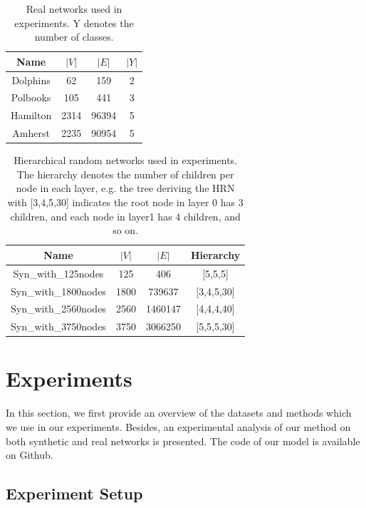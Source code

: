 \documentclass{article}
\theoremstyle{definition}
\begin{document}
 \begin{table}
		\centering
		\begin{tabular}{|c|c|c|c|}
			\hline
			Name & $|V|$ & $|E|$ & $|Y|$\\
			\hline
			Dolphins & 62 & 159 & 2\\
			Polbooks & 105 & 441 & 3\\
			Hamilton & 2314 & 96394 & 5\\
			Amherst & 2235 & 90954 & 5\\
			\hline
		\end{tabular}
		\caption{Real networks used in experiments. Y denotes the number of classes.}
		\label{tab:real_datasets}
	\end{table}
		
	\begin{table}
		\centering
		\begin{tabular}{|c|c|c|c|}
			\hline
			Name & $|V|$ & $|E|$ & Hierarchy \\
			\hline
			Syn\_with\_125nodes & 125 & 406 & [5,5,5]\\
			Syn\_with\_1800nodes & 1800 & 739637 & [3,4,5,30]\\
			Syn\_with\_2560nodes & 2560 & 1460147 & [4,4,4,40]\\
			Syn\_with\_3750nodes & 3750 & 3066250 & [5,5,5,30]\\
			\hline
		\end{tabular}
		\caption{Hierarchical random networks used in experiments. The hierarchy denotes the number of children per node in each layer, e.g. the tree deriving the HRN with [3,4,5,30] indicates the root node in layer 0 has 3 children, and each node in layer1 has 4 children, and so on.}
		\label{tab:syn_datasets}
	\end{table}


\section{Experiments}
	In this section, we first provide an overview of the datasets and methods which we use in our experiments. Besides, an experimental analysis of our method on both synthetic and real networks is presented. The code of our model is available on Github.
	

	\subsection{Experiment Setup}
	
\end{document}
